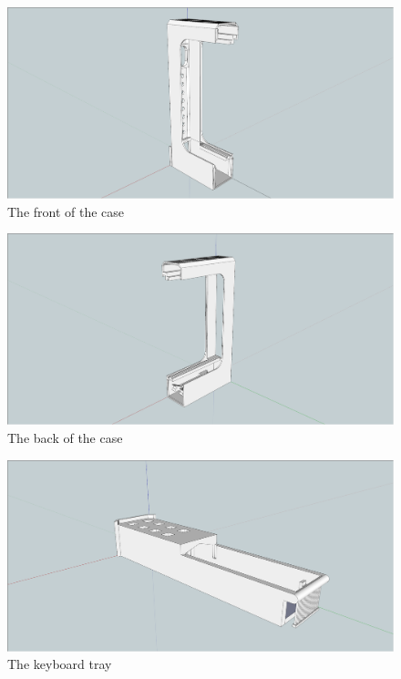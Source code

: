 \newpage
\begin{figure}
\includegraphics[width=\textwidth,keepaspectratio,clip]{appendix/screen-shots/case-front.png}%
\caption{The front of the case}
\end{figure}
\newpage
\begin{figure}
\includegraphics[width=\textwidth,keepaspectratio,clip]{appendix/screen-shots/case-back.png}%
\caption{The back of the case}
\end{figure}
\newpage
\begin{figure}
\includegraphics[width=\textwidth,keepaspectratio,clip]{appendix/screen-shots/keyboard.png}%
\caption{The keyboard tray}
\end{figure}
